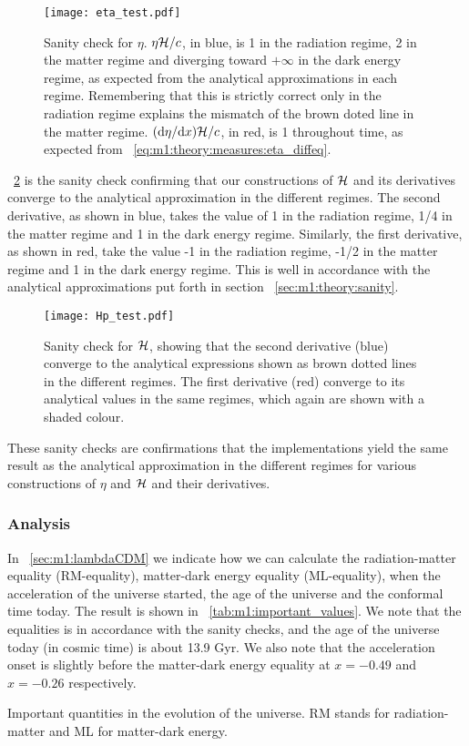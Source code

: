     \begin{figure}
        \texttt{[image: eta\_test.pdf]}
        \caption{Sanity check for $\eta$. $\eta\mathcal{H}/c$, in blue, is 1 in the radiation regime, 2 in the matter regime and diverging toward $+\infty$ in the dark energy regime, as expected from the analytical approximations in each regime. Remembering that this is strictly correct only in the radiation regime explains the mismatch of the brown doted line in the matter regime. $(\mathrm{d} \eta /\mathrm{d} x)\mathcal{H}/c$, in red, is 1 throughout time, as expected from ~\cref{eq:m1:theory:measures:eta_diffeq}.}
        \label{fig:m1:eta_tests}
    \end{figure}

    ~\cref{fig:m1:Hp_tests} is the sanity check confirming that our constructions of $\mathcal{H}$ and its derivatives converge to the analytical approximation in the different regimes. The second derivative, as shown in blue, takes the value of 1 in the radiation regime, 1/4 in the matter regime and 1 in the dark energy regime. Similarly, the first derivative, as shown in red, take the value -1 in the radiation regime, -1/2 in the matter regime and 1 in the dark energy regime. This is well in accordance with the analytical approximations put forth in section ~\cref{sec:m1:theory:sanity}. 

    \begin{figure}
        \texttt{[image: Hp\_test.pdf]}
        \caption{Sanity check for $\mathcal{H}$, showing that the second derivative (blue) converge to the analytical expressions shown as brown dotted lines in the different regimes. The first derivative (red) converge to its analytical values in the same regimes, which again are shown with a shaded colour.}
        \label{fig:m1:Hp_tests}
    \end{figure}

    These sanity checks are confirmations that the implementations yield the same result as the analytical approximation in the different regimes for various constructions of $\eta$ and $\mathcal{H}$ and their derivatives.
    
\subsubsection{Analysis}

    In ~\cref{sec:m1:lambdaCDM} we indicate how we can calculate the radiation-matter equality (RM-equality), matter-dark energy equality (ML-equality), when the acceleration of the universe started, the age of the universe and the conformal time today. The result is shown in ~\cref{tab:m1:important_values}. We note that the equalities is in accordance with the sanity checks, and the age of the universe today (in cosmic time) is about 13.9 Gyr. We also note that the acceleration onset is slightly before the matter-dark energy equality at $x=-0.49$ and $x=-0.26$ respectively. 
    \begin{table}
        
        \caption{Important quantities in the evolution of the universe. RM stands for radiation-matter and ML for matter-dark energy.}
        \label{tab:m1:important_values}
    \end{table}

